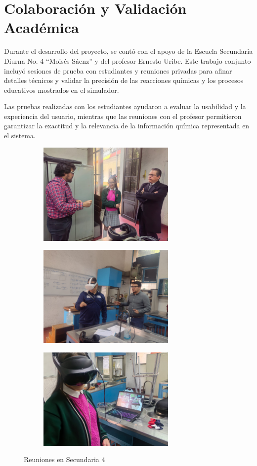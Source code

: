 \section{Colaboración y Validación Académica}
Durante el desarrollo del proyecto, se contó con el apoyo de la Escuela Secundaria Diurna No. 4 ``Moisés Sáenz'' y del profesor Ernesto Uribe. Este trabajo conjunto incluyó sesiones de prueba con estudiantes y reuniones privadas para afinar detalles técnicos y validar la precisión de las reacciones químicas y los procesos educativos mostrados en el simulador.

Las pruebas realizadas con los estudiantes ayudaron a evaluar la usabilidad y la experiencia del usuario, mientras que las reuniones con el profesor permitieron garantizar la exactitud y la relevancia de la información química representada en el sistema.
\begin{figure}[thbp]
    \centering
    \begin{subfigure}{0.45\linewidth}
        \includegraphics[width=\linewidth, height = 5cm]{img/chapter06/Sec_02.jpg}
    \end{subfigure}
    \begin{subfigure}{0.45\linewidth}
        \includegraphics[width=\linewidth, height = 5cm]{img/chapter06/Sec_08.jpg}
    \end{subfigure}
    \begin{subfigure}{0.45\linewidth}
        \includegraphics[width=\linewidth, height = 5cm]{img/chapter06/Sec_05.jpg}
    \end{subfigure}
    \caption{Reuniones en Secundaria 4}
\end{figure}